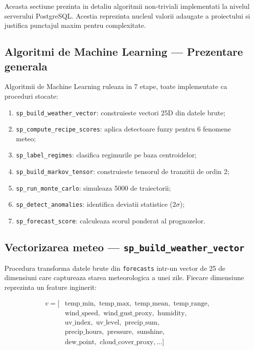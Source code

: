 \documentclass[12pt,a4paper]{article}
\begin{document}
Aceasta sectiune prezinta in detaliu algoritmii non-triviali implementati la nivelul serverului PostgreSQL. Acestia reprezinta nucleul valorii adaugate a proiectului si justifica punctajul maxim pentru complexitate.

\subsection{Algoritmi de Machine Learning --- Prezentare generala}

Algoritmii de Machine Learning ruleaza in 7 etape, toate implementate ca proceduri stocate:

\begin{algobox}
\begin{enumerate}
    \item \texttt{sp\_build\_weather\_vector}: construieste vectori 25D din datele brute;
    \item \texttt{sp\_compute\_recipe\_scores}: aplica detectoare fuzzy pentru 6 fenomene meteo;
    \item \texttt{sp\_label\_regimes}: clasifica regimurile pe baza centroidelor;
    \item \texttt{sp\_build\_markov\_tensor}: construieste tensorul de tranzitii de ordin 2;
    \item \texttt{sp\_run\_monte\_carlo}: simuleaza 5000 de traiectorii;
    \item \texttt{sp\_detect\_anomalies}: identifica deviatii statistice ($2\sigma$);
    \item \texttt{sp\_forecast\_score}: calculeaza scorul ponderat al prognozelor.
\end{enumerate}
\end{algobox}

\subsection{Vectorizarea meteo --- \texttt{sp\_build\_weather\_vector}}

Procedura transforma datele brute din \texttt{forecasts} intr-un vector de 25 de dimensiuni care captureaza starea meteorologica a unei zile. Fiecare dimensiune reprezinta un feature inginerit:

\begin{align*}
v = [&\text{temp\_min}, \text{ temp\_max}, \text{ temp\_mean}, \text{ temp\_range}, \\
    &\text{wind\_speed}, \text{ wind\_gust\_proxy}, \text{ humidity}, \\
    &\text{uv\_index}, \text{ uv\_level}, \text{ precip\_sum}, \\
    &\text{precip\_hours}, \text{ pressure}, \text{ sunshine}, \\
    &\text{dew\_point}, \text{ cloud\_cover\_proxy}, \dots]
\end{align*}
\end{document}
